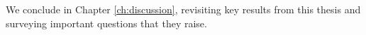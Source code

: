 We conclude in Chapter \ref{ch:discussion}, revisiting key results from this thesis and surveying important questions that they raise.





